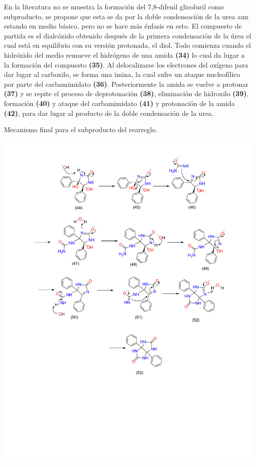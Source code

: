 \documentclass[fleqn,10pt]{SelfArx}
\begin{document}
En la literatura no se muestra la formación del 7,8-difenil glicoluril como subproducto, se propone que esta se da por la doble condensación de la urea aun estando en medio básico, pero no se hace más énfasis en esto. El compuesto de partida es el dialcóxido obtenido después de la primera condensación de la úrea \cite{li2010}\cite{sachdev2010} el cual está en equilibrio con su versión protonada, el diol. Todo comienza cuando el hidróxido del medio remueve el hidrógeno de una amida \textbf{(34)} lo cual da lugar a la formación del compuesto \textbf{(35)}. Al delocalizarse los electrones del oxígeno para dar lugar al carboxilo, se forma una imina, la cual sufre un ataque nucleofílico por parte del carbamimidato \textbf{(36)}. Posteriormente la amida se vuelve a protonar \textbf{(37)} y se repite el proceso de deprotonación \textbf{(38)}, eliminación de hidroxilo \textbf{(39)}, formación \textbf{(40)} y ataque del carbamimidato \textbf{(41)} y protonación de la amida \textbf{(42)}, para dar lugar al producto de la doble condensación de la urea.
\begin{scheme}[h]
	\centering
	\caption{Mecanismo final para el subproducto del rearreglo.}
	\includegraphics[width=\linewidth]{structures/subproducto_esquema_4.pdf}
\end{scheme}
\end{document}
